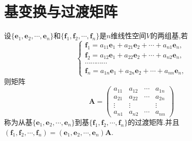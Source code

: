 \documentclass[../../main.tex]{subfiles}
\begin{document}
\section{基变换与过渡矩阵}

\begin{definition}[过渡矩阵]\label{definition:过渡矩阵}
设\(\{\boldsymbol{e}_1,\boldsymbol{e}_2,\cdots,\boldsymbol{e}_n\}\)和\(\{\boldsymbol{f}_1,\boldsymbol{f}_2,\cdots,\boldsymbol{f}_n\}\)是\(n\)维线性空间\(V\)的两组基,若
\[
\begin{cases}
\boldsymbol{f}_1 = a_{11}\boldsymbol{e}_1 + a_{21}\boldsymbol{e}_2+\cdots + a_{n1}\boldsymbol{e}_n,\\
\boldsymbol{f}_2 = a_{12}\boldsymbol{e}_1 + a_{22}\boldsymbol{e}_2+\cdots + a_{n2}\boldsymbol{e}_n,\\
\cdots\cdots\cdots\cdots\\
\boldsymbol{f}_n = a_{1n}\boldsymbol{e}_1 + a_{2n}\boldsymbol{e}_2+\cdots + a_{nn}\boldsymbol{e}_n,
\end{cases}
\]
则矩阵
\[
\boldsymbol{A}=\begin{pmatrix}
a_{11}&a_{12}&\cdots&a_{1n}\\
a_{21}&a_{22}&\cdots&a_{2n}\\
\vdots&\vdots&&\vdots\\
a_{n1}&a_{n2}&\cdots&a_{nn}
\end{pmatrix}
\]
称为从基\(\{\boldsymbol{e}_1,\boldsymbol{e}_2,\cdots,\boldsymbol{e}_n\}\)到基\(\{\boldsymbol{f}_1,\boldsymbol{f}_2,\cdots,\boldsymbol{f}_n\}\)的过渡矩阵.并且$\left( \boldsymbol{f}_1,\boldsymbol{f}_2,\cdots ,\boldsymbol{f}_n \right) =\left( \boldsymbol{e}_1,\boldsymbol{e}_2,\cdots ,\boldsymbol{e}_n \right) \boldsymbol{A}$.
\end{definition}
\end{document}
